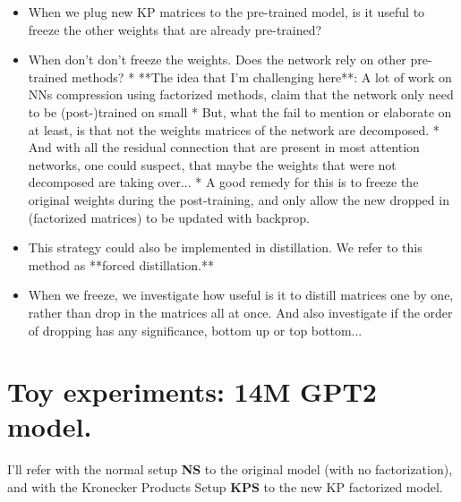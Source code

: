 \documentclass{article}
\begin{document}
{\begin{itemize}
	\item When we plug new KP matrices to the pre-trained model, is it useful to freeze the other weights that are already pre-trained?
	\item When don't don't freeze the weights. Does the network rely on other pre-trained methods?
   * **The idea that I'm challenging here**: A lot of work on NNs compression using factorized methods,
     claim that the network only need to be (post-)trained on small %
   * But, what the fail to mention or elaborate on at least, is that not the weights matrices of the network are decomposed.
   * And with all the residual connection that are present in most attention networks, 
     one could suspect, that maybe the weights that were not decomposed are taking over...
   * A good remedy for this is to freeze the original weights during the post-training, and only allow the new dropped in (factorized matrices) to be updated with backprop.
	\item This strategy could also be implemented in distillation. We refer to this method as **forced distillation.**
	\item When we freeze, we investigate how useful is it to distill matrices one by one, rather than drop in the matrices all at once. And also investigate if the order of dropping has any significance, bottom up or top bottom...

\end{itemize}

\section{Toy experiments: 14M GPT2 model.}%
\label{sec:GPT2-Mini}

I'll refer with the normal setup \textbf{NS} to the original model (with no factorization), and with the Kronecker Products Setup \textbf{KPS} to the new KP factorized model.

}
\end{document}
